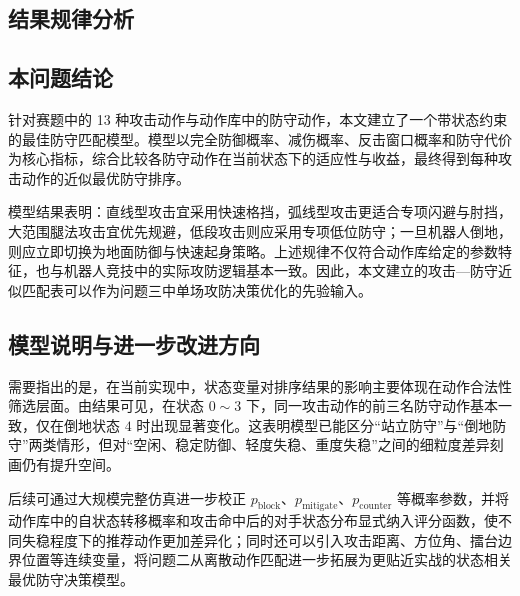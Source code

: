 \subsection{结果规律分析}

\immediate{}

\subsection{本问题结论}

针对赛题中的 13 种攻击动作与动作库中的防守动作，本文建立了一个带状态约束的最佳防守匹配模型。模型以完全防御概率、减伤概率、反击窗口概率和防守代价为核心指标，综合比较各防守动作在当前状态下的适应性与收益，最终得到每种攻击动作的近似最优防守排序。

模型结果表明：直线型攻击宜采用快速格挡，弧线型攻击更适合专项闪避与肘挡，大范围腿法攻击宜优先规避，低段攻击则应采用专项低位防守；一旦机器人倒地，则应立即切换为地面防御与快速起身策略。上述规律不仅符合动作库给定的参数特征，也与机器人竞技中的实际攻防逻辑基本一致。因此，本文建立的攻击—防守近似匹配表可以作为问题三中单场攻防决策优化的先验输入。

\subsection{模型说明与进一步改进方向}

需要指出的是，在当前实现中，状态变量对排序结果的影响主要体现在动作合法性筛选层面。由结果可见，在状态 \(0\sim 3\) 下，同一攻击动作的前三名防守动作基本一致，仅在倒地状态 \(4\) 时出现显著变化。这表明模型已能区分“站立防守”与“倒地防守”两类情形，但对“空闲、稳定防御、轻度失稳、重度失稳”之间的细粒度差异刻画仍有提升空间。

后续可通过大规模完整仿真进一步校正 \(p_{\text{block}}\)、\(p_{\text{mitigate}}\)、\(p_{\text{counter}}\) 等概率参数，并将动作库中的自状态转移概率和攻击命中后的对手状态分布显式纳入评分函数，使不同失稳程度下的推荐动作更加差异化；同时还可以引入攻击距离、方位角、擂台边界位置等连续变量，将问题二从离散动作匹配进一步拓展为更贴近实战的状态相关最优防守决策模型。
